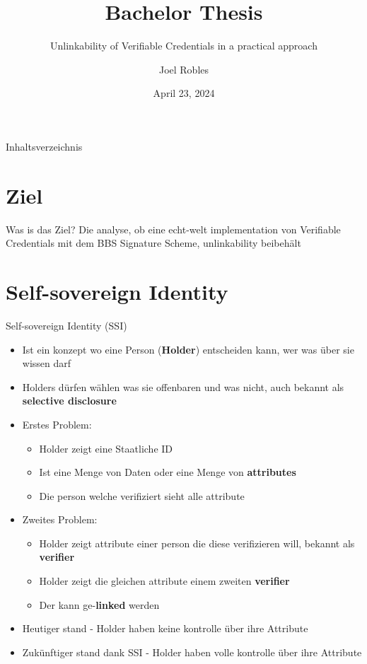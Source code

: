 \documentclass[
	german,%
	authorontitle=true,
	]{bfhbeamer}
\title{Bachelor Thesis}
\subtitle{Unlinkability of Verifiable Credentials in a practical approach}
\author[J. Robles]{Joel Robles}
\institute{TI}
\date{April 23, 2024}
\begin{document}
\maketitle

\begin{frame}{Inhaltsverzeichnis}
    \tableofcontents
\end{frame}

\section{Ziel}

\begin{frame}{Was is das Ziel?}
    \centering
    Die analyse, ob eine echt-welt implementation von Verifiable Credentials mit dem BBS Signature Scheme, unlinkability beibehält
\end{frame}

\section{Self-sovereign Identity}

\begin{frame}{Self-sovereign Identity (SSI)}
    \begin{itemize}
        \item Ist ein konzept wo eine Person (\textbf{Holder}) entscheiden kann, wer was über sie wissen darf
        \item Holders dürfen wählen was sie offenbaren und was nicht, auch bekannt als \textbf{selective disclosure}
        \item Erstes Problem:
        \begin{itemize}
            \item Holder zeigt eine Staatliche ID
            \item Ist eine Menge von Daten oder eine Menge von \textbf{attributes}
            \item Die person welche verifiziert sieht alle attribute
        \end{itemize}
        \item Zweites Problem:
        \begin{itemize}
            \item Holder zeigt attribute einer person die diese verifizieren will, bekannt als \textbf{verifier}
            \item Holder zeigt die gleichen attribute einem zweiten \textbf{verifier}
            \item Der kann ge-\textbf{linked} werden
        \end{itemize}
        \item Heutiger stand - Holder haben keine kontrolle über ihre Attribute
        \item Zukünftiger stand dank SSI - Holder haben volle kontrolle über ihre Attribute
    \end{itemize}
\end{frame}
\end{document}
